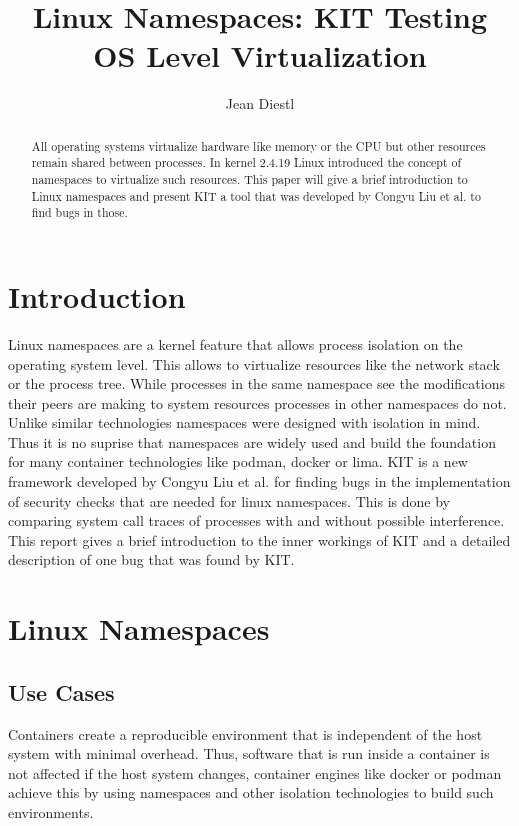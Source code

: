 \documentclass[10pt,twocolumn,a4paper]{article}
\author{Jean Diestl}
\begin{document}
\title{Linux Namespaces: KIT Testing OS Level Virtualization}

\newcommand{\todo}[1]{{\texttt{[#1]}}}
\newcommand{\code}[1]{{\tt \small{#1}}}

\maketitle
\lstset{language=C, basicstyle=\ttfamily,
        columns=fullflexible,
        string=[b]', showspaces=false, showtabs=false,
         captionpos=b,
        framerule=1pt,
        breaklines=true, breakatwhitespace=true,
        autogobble=true}


\begin{abstract}
All operating systems virtualize hardware like memory or the CPU but other resources remain shared between processes.
In kernel 2.4.19 Linux introduced the concept of namespaces to virtualize such resources. This paper will give a brief 
introduction to Linux namespaces and present KIT a tool that was developed by Congyu Liu et al. to
find bugs in those.
\end{abstract}

\section{Introduction}\label{sec:introduction}
Linux namespaces are a kernel feature that allows process isolation on the operating system level.
This allows to virtualize resources like the network stack or the process tree.
While processes in the same namespace see the modifications their peers are making to system resources
processes in other namespaces do not. Unlike similar technologies namespaces were designed with
isolation in mind. Thus it is no suprise that namespaces are widely used and build the foundation
for many container technologies like podman, docker or lima.
KIT is a new framework developed by Congyu Liu et al. for finding bugs in the implementation of
security checks that are needed for linux namespaces\cite{0}. 
This is done by comparing system call traces of processes with and without possible interference.
This report gives a brief introduction to the inner
workings of KIT and a detailed description of one bug
that was found by KIT. 

\section{Linux Namespaces}
\subsection{Use Cases}
Containers create a reproducible environment that is independent of the host system with minimal overhead.
Thus, software that is run inside a container is not affected if the host system changes, 
container engines like docker or podman achieve this by using namespaces and other isolation
technologies to build such environments.
\end{document}
